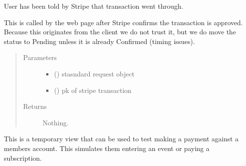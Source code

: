 \documentclass[letterpaper,10pt,english]{sphinxmanual}
\begin{document}
\begin{fulllineitems}
\label{\detokenize{payments:payments.views.stripe_webpage_confirm}}
User has been told by Stripe that transaction went through.

This is called by the web page after Stripe confirms the transaction is approved.
Because this originates from the client we do not trust it, but we do move
the status to Pending unless it is already Confirmed (timing issues).
\begin{quote}\begin{description}
\item[{Parameters}] \leavevmode\begin{itemize}
\item {} 
 () \textendash{} stasndard request object

\item {} 
 () \textendash{} pk of stripe transaction

\end{itemize}

\item[{Returns}] \leavevmode
Nothing.

\end{description}\end{quote}

\end{fulllineitems}


\begin{fulllineitems}
\label{\detokenize{payments:payments.views.test_payment}}
This is a temporary view that can be used to test making a payment against
a members account. This simulates them entering an event or paying a subscription.

\end{fulllineitems}

\end{document}

